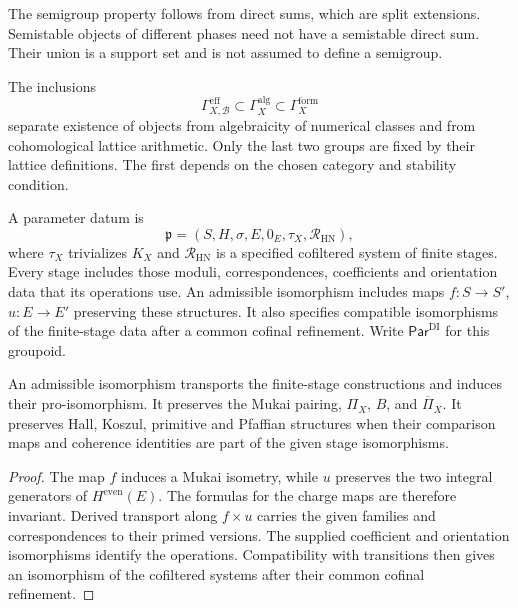 The semigroup property follows from direct sums, which are split
extensions.  Semistable objects of different phases need not have a
semistable direct sum.  Their union is a support set and is not
assumed to define a semigroup.

\begin{remark}
\label{rem:three-tier-inclusion}
The inclusions
\[
\Gamma_{X,\mathcal B}^{\mathrm{eff}}
\subset\Gamma_X^{\mathrm{alg}}
\subset\Gamma_X^{\mathrm{form}}
\]
separate existence of objects from algebraicity of numerical classes
and from cohomological lattice arithmetic.  Only the last two groups
are fixed by their lattice definitions.  The first depends on the
chosen category and stability condition.
\end{remark}

\begin{definition}
\label{def:admissible-dirac-igusa-parameter-datum}
A parameter datum is
\[
\mathfrak p=(S,H,\sigma,E,0_E,\tau_X,\mathcal R_{\mathrm{HN}}),
\]
where $\tau_X$ trivializes $K_X$ and $\mathcal R_{\mathrm{HN}}$ is a
specified cofiltered system of finite stages.  Every stage includes
those moduli, correspondences, coefficients and orientation data that
its operations use.  An admissible isomorphism includes maps $f:S\to S'$, $u:E\to E'$
preserving these structures.  It also specifies compatible
isomorphisms of the finite-stage data after a common cofinal refinement.  Write
$\mathsf{Par}^{\mathrm{DI}}$ for this groupoid.
\end{definition}

\begin{proposition}
\label{prop:admissible-base-change-functoriality}
An admissible isomorphism transports the finite-stage constructions
and induces their pro-isomorphism.  It preserves the Mukai pairing,
$\Pi_X$, $B$, and $\overline\Pi_X$.  It preserves Hall, Koszul,
primitive and Pfaffian structures when their comparison maps and
coherence identities are part of the given stage isomorphisms.
\end{proposition}

\begin{proof}
The map $f$ induces a Mukai isometry, while $u$ preserves the two
integral generators of $H^{\mathrm{even}}(E)$.  The formulas for the
charge maps are therefore invariant.  Derived transport along
$f\times u$ carries the given families and correspondences to their
primed versions.  The supplied coefficient and orientation
isomorphisms identify the operations.  Compatibility with transitions
then gives an isomorphism of the cofiltered systems after their
common cofinal refinement.
\end{proof}

